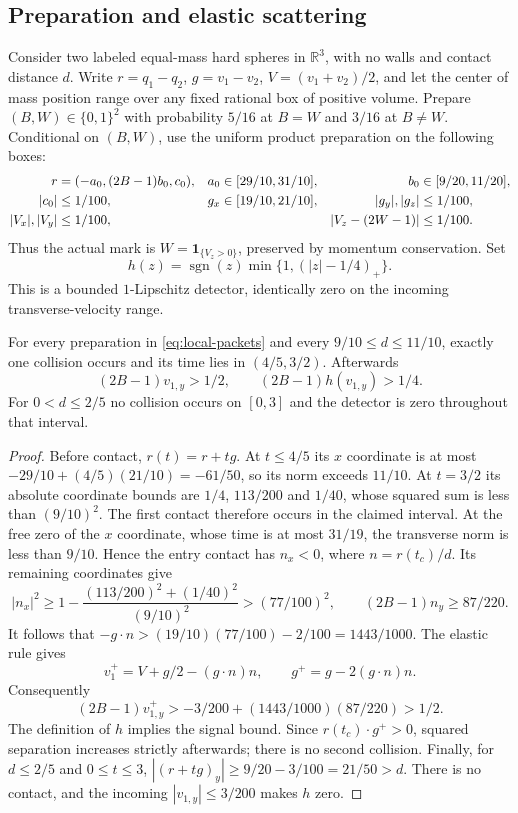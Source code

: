 \subsection{Preparation and elastic scattering}
Consider two labeled equal-mass hard spheres in $\mathbb R^3$, with no
walls and contact distance $d$. Write $r=q_1-q_2$, $g=v_1-v_2$,
$V=(v_1+v_2)/2$, and let the center of mass position range over any fixed
rational box of positive volume. Prepare $(B,W)\in\{0,1\}^2$ with
probability $5/16$ at $B=W$ and $3/16$ at $B\ne W$. Conditional on
$(B,W)$, use the uniform product preparation on the following boxes:
\begin{align}
 r&=(-a_0,(2B-1)b_0,c_0),&
 a_0&\in[29/10,31/10],& b_0&\in[9/20,11/20],\notag\\
 |c_0|&\le1/100,&g_x&\in[19/10,21/10],&
 |g_y|,|g_z|&\le1/100,\label{eq:local-packets}\\
 |V_x|,|V_y|&\le1/100,&&&|V_z-(2W-1)|&\le1/100.\notag
\end{align}
Thus the actual mark is $W=\mathbf1_{\{V_z>0\}}$, preserved by momentum
conservation. Set
\[
 h(z)=\operatorname{sgn}(z)\min\{1,(|z|-1/4)_+\}.
\]
This is a bounded $1$-Lipschitz detector, identically zero on the incoming
transverse-velocity range.

\begin{lemma}\label{lem:local-scattering}
For every preparation in \eqref{eq:local-packets} and every
$9/10\le d\le11/10$, exactly one collision occurs and its time lies in
$(4/5,3/2)$. Afterwards
\[
             (2B-1)v_{1,y}>1/2,\qquad (2B-1)h(v_{1,y})>1/4.
\]
For $0<d\le2/5$ no collision occurs on $[0,3]$ and the detector is zero
throughout that interval.
\end{lemma}
\begin{proof}
Before contact, $r(t)=r+tg$. At $t\le4/5$ its $x$ coordinate is at
most $-29/10+(4/5)(21/10)=-61/50$, so its norm exceeds $11/10$.
At $t=3/2$ its absolute coordinate bounds are $1/4$, $113/200$ and
$1/40$, whose squared sum is less than $(9/10)^2$. The first contact
therefore occurs in the claimed interval. At the free zero of the
$x$ coordinate, whose time is at most $31/19$, the transverse norm is
less than $9/10$. Hence the entry contact has $n_x<0$, where
$n=r(t_c)/d$. Its remaining coordinates give
\[
 |n_x|^2\ge1-\frac{(113/200)^2+(1/40)^2}{(9/10)^2}>(77/100)^2,
 \qquad (2B-1)n_y\ge87/220.
\]
It follows that $-g\cdot n>(19/10)(77/100)-2/100=1443/1000$.
The elastic rule gives
\[
 v_1^+=V+g/2-(g\cdot n)n,\qquad g^+=g-2(g\cdot n)n.
\]
Consequently
\[
 (2B-1)v_{1,y}^+>-3/200+(1443/1000)(87/220)>1/2.
\]
The definition of $h$ implies the signal bound. Since
$r(t_c)\cdot g^+>0$, squared separation increases strictly afterwards;
there is no second collision. Finally, for $d\le2/5$ and $0\le t\le3$,
$|(r+tg)_y|\ge9/20-3/100=21/50>d$. There is no contact, and the
incoming $|v_{1,y}|\le3/200$ makes $h$ zero.
\end{proof}

